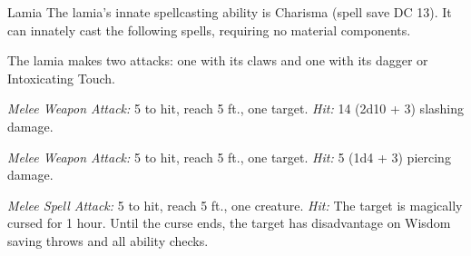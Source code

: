 \documentclass[10pt,a4paper,twoside,bg=print,twocolumn,openany,nodeprecatedcode]{dndbook}
\begin{document}
\begin{DndMonster}[float=t]{Lamia}
\DndMonsterBasics[
armor-class = {13 (natural armor)},
hit-points = {\DndDice{13d10 + 26}},
speed = {30 ft.}
]
\DndMonsterAbilityScores[
 str = 16,
 dex = 13,
 con = 15,
 int = 14,
 wis = 15,
 cha = 16
]
\DndMonsterDetails[
skills = {Deception +7, Insight +4, Stealth +3},
senses = {darkvision 60 ft., passive perception 12},
languages = {Abyssal, Common},
challenge = 4,
]
The lamia's innate spellcasting ability is Charisma (spell save DC 13). It can innately cast the following spells, requiring no material components.
\begin{DndMonsterSpells}
\end{DndMonsterSpells}
The lamia makes two attacks: one with its claws and one with its dagger or Intoxicating Touch.

\textsl{Melee Weapon Attack:} 5 to hit, reach 5 ft., one target. \textsl{Hit:} 14 (2d10 + 3) slashing damage.

\textsl{Melee Weapon Attack:} 5 to hit, reach 5 ft., one target. \textsl{Hit:} 5 (1d4 + 3) piercing damage.

\textsl{Melee Spell Attack:} 5 to hit, reach 5 ft., one creature. \textsl{Hit:} The target is magically cursed for 1 hour. Until the curse ends, the target has disadvantage on Wisdom saving throws and all ability checks.

\end{DndMonster}
\end{document}
